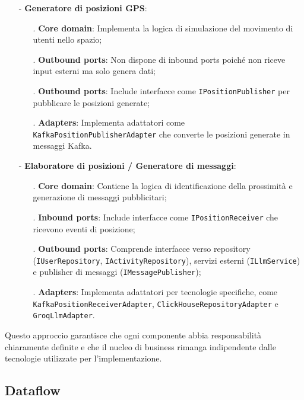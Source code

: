 \documentclass[10pt]{article}
\begin{document}
    \begin{itemize}
        \item[-] \textbf{Generatore di posizioni GPS}:
        \begin{itemize}
            \item[.] \textbf{Core domain}: Implementa la logica di simulazione del movimento di utenti nello spazio;
            \item[.] \textbf{Outbound ports}: Non dispone di inbound ports poiché non riceve input esterni ma solo genera dati;
            \item[.] \textbf{Outbound ports}: Include interfacce come \texttt{IPositionPublisher} per pubblicare le posizioni generate;
            \item[.] \textbf{Adapters}: Implementa adattatori come \texttt{KafkaPositionPublisherAdapter} che converte le posizioni generate in messaggi Kafka.
        \end{itemize}

        \item[-] \textbf{Elaboratore di posizioni / Generatore di messaggi}:
        \begin{itemize}
            \item[.] \textbf{Core domain}: Contiene la logica di identificazione della prossimità e generazione di messaggi pubblicitari;
            \item[.] \textbf{Inbound ports}: Include interfacce come \texttt{IPositionReceiver} che ricevono eventi di posizione;
            \item[.] \textbf{Outbound ports}: Comprende interfacce verso repository (\texttt{IUserRepository}, \texttt{IActivityRepository}), servizi esterni (\texttt{ILlmService}) e publisher di messaggi (\texttt{IMessagePublisher});
            \item[.] \textbf{Adapters}: Implementa adattatori per tecnologie specifiche, come \texttt{KafkaPositionReceiverAdapter}, \texttt{ClickHouseRepositoryAdapter} e \texttt{GroqLlmAdapter}.
        \end{itemize}
    \end{itemize}

    Questo approccio garantisce che ogni componente abbia responsabilità chiaramente definite e che il nucleo di business rimanga indipendente dalle tecnologie utilizzate per l'implementazione.

    \subsection{Dataflow}
\end{document}
